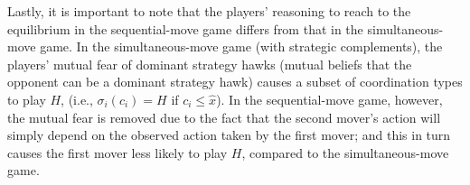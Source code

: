 \documentclass[12pt,english]{article}
\begin{document}
Lastly, it is important to note that the players' reasoning to reach to the equilibrium in the sequential-move game differs from that in the simultaneous-move game. In the simultaneous-move game (with strategic complements), the players' mutual fear of dominant strategy hawks (mutual beliefs that the opponent can be a dominant strategy hawk) causes a subset of coordination types to play $H$, (i.e., $\sigma_i(c_i)=H$ if $c_i \leq \hat{x}$). In the sequential-move game, however, the mutual fear is removed due to the fact that the second mover's action will simply depend on the observed action taken by the first mover;  and this in turn causes the first mover less likely to play $H$, compared to the simultaneous-move game. 
\end{document}
